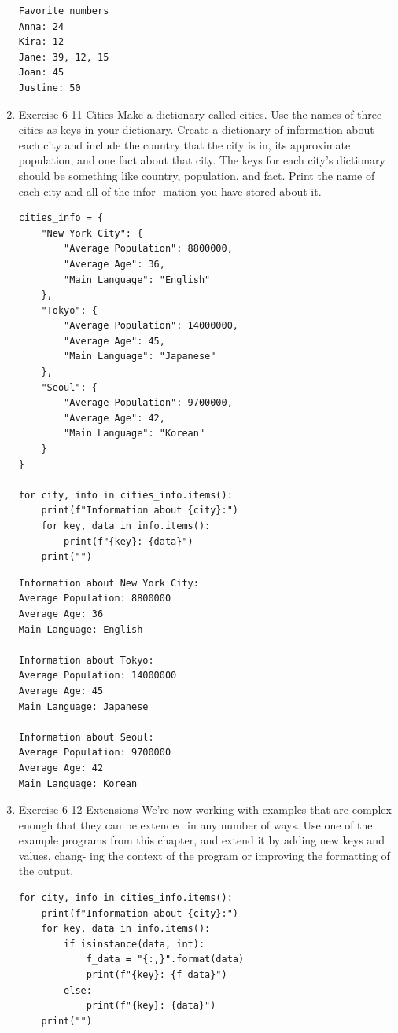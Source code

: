 \documentclass[10pt]{book}
\begin{document}
\begin{enumerate}
\label{org6be6811}
\begin{verbatim}
Favorite numbers
Anna: 24
Kira: 12
Jane: 39, 12, 15
Joan: 45
Justine: 50
\end{verbatim}
\item Exercise 6-11 Cities
\label{sec:org9b1133c}
Make a dictionary called cities. Use the names of three cities as keys in your dictionary. Create a dictionary of information about each city and include the country that the city is in, its approximate population, and one fact about that city. The keys for each city’s dictionary should be something like country, population, and fact. Print the name of each city and all of the infor- mation you have stored about it.
\begin{verbatim}
cities_info = {
    "New York City": {
        "Average Population": 8800000,
        "Average Age": 36,
        "Main Language": "English"
    },
    "Tokyo": {
        "Average Population": 14000000,
        "Average Age": 45,
        "Main Language": "Japanese"
    },
    "Seoul": {
        "Average Population": 9700000,
        "Average Age": 42,
        "Main Language": "Korean"
    }
}

for city, info in cities_info.items():
    print(f"Information about {city}:")
    for key, data in info.items():
        print(f"{key}: {data}")
    print("")
\end{verbatim}

\label{orgaa03ed0}
\begin{verbatim}
Information about New York City:
Average Population: 8800000
Average Age: 36
Main Language: English

Information about Tokyo:
Average Population: 14000000
Average Age: 45
Main Language: Japanese

Information about Seoul:
Average Population: 9700000
Average Age: 42
Main Language: Korean
\end{verbatim}
\item Exercise 6-12 Extensions
\label{sec:org8383f86}
We’re now working with examples that are complex enough that they can be extended in any number of ways. Use one of the example programs from this chapter, and extend it by adding new keys and values, chang- ing the context of the program or improving the formatting of the output.
\begin{verbatim}
for city, info in cities_info.items():
    print(f"Information about {city}:")
    for key, data in info.items():
        if isinstance(data, int):
            f_data = "{:,}".format(data)
            print(f"{key}: {f_data}")
        else:
            print(f"{key}: {data}")
    print("")
\end{verbatim}


\end{enumerate}
\end{document}
